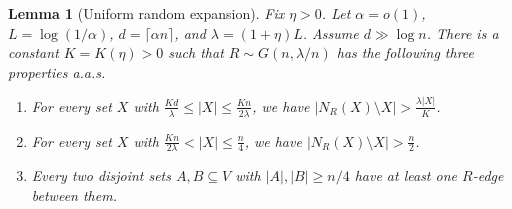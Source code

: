 \documentclass[10pt,a4paper]{amsart}
\newtheorem{lemma}{Lemma}
\renewcommand\ge{\geqslant}
\renewcommand\le{\leqslant}
\begin{document}
\begin{lemma}[Uniform random expansion]\label{lem:expansion}
Fix $\eta>0$. Let $\alpha=o(1)$, $L=\log(1/\alpha)$, $d=\lceil\alpha n\rceil$, and $\lambda=(1+\eta)L$. Assume $d\gg \log n$. There is a constant $K=K(\eta)>0$ such that $R\sim G(n,\lambda/n)$ has the following three properties a.a.s.
\begin{enumerate}[label=\textnormal{(E\arabic*)}]
    \item \label{E1} For every set $X$ with $\frac{Kd}{\lambda}\le|X|\le\frac{Kn}{2\lambda}$, we have $|N_{R}(X)\setminus X|>\frac{\lambda|X|}{K}$.
    \item \label{E2} For every set $X$ with $\frac{Kn}{2\lambda}<|X|\le\frac{n}{4}$, we have $|N_{R}(X)\setminus X|>\frac{n}{2}$.
    \item \label{E3} Every two disjoint sets $A, B\subseteq V$ with $|A|,|B|\ge n/4$ have at least one $R$-edge between them.
\end{enumerate}
\end{lemma}
\end{document}
